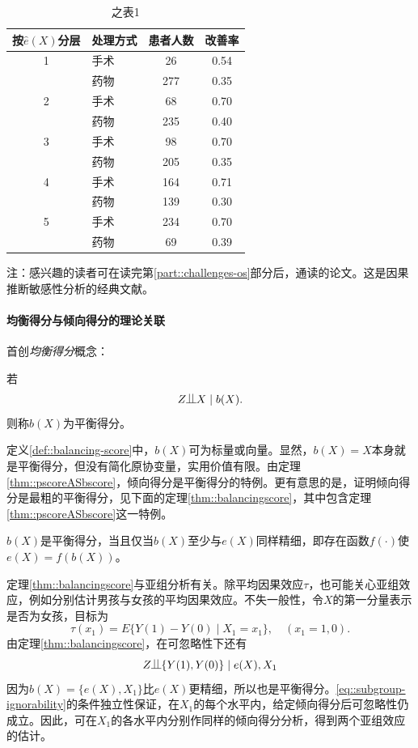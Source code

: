\begin{table}
\caption{\citet{Rosenbaum::1983JRSSB}之表1}\label{table::rr1983table1}
\begin{tabular}{clcc}
\hline 
按$\hat{e}(X)$分层 & 处理方式 &  患者人数 & 改善率\\
\hline 1 & 手术 & 26 & 0.54 \\
& 药物 & 277 & 0.35 \\
2 & 手术 & 68 & 0.70 \\
& 药物 & 235 & 0.40 \\
3 & 手术 & 98 & 0.70 \\
& 药物 & 205 & 0.35 \\
4 & 手术 & 164 & 0.71 \\
& 药物 & 139 & 0.30 \\
5 & 手术 & 234 & 0.70 \\
& 药物 & 69 & 0.39 \\
\hline
\end{tabular}
\end{table}


注：感兴趣的读者可在读完第\ref{part::challenges-os}部分后，通读\citet{Rosenbaum::1983JRSSB}的论文。这是因果推断敏感性分析的经典文献。 

 


\paragraph{均衡得分与倾向得分的理论关联}
\label{hw::balancingscore-rr1983}


\citet{rosenbaum1983central}首创{\it 均衡得分}概念：

\begin{definition}
[均衡得分]\label{def::balancing-score}
  若
$$
  Z\ind X\mid b(X).
  $$
则称$b(X)$为平衡得分。
\end{definition}

定义\ref{def::balancing-score}中，$b(X)$可为标量或向量。显然，$b(X) = X$本身就是平衡得分，但没有简化原协变量，实用价值有限。由定理\ref{thm::pscoreASbscore}，倾向得分是平衡得分的特例。更有意思的是，\citet{rosenbaum1983central}证明倾向得分是最粗的平衡得分，见下面的定理\ref{thm::balancingscore}，其中包含定理\ref{thm::pscoreASbscore}这一特例。 


\begin{theorem}
\label{thm::balancingscore}
$b(X)$是平衡得分，当且仅当$b(X)$至少与$e(X)$同样精细，即存在函数$f(\cdot)$使$e(X) = f(b(X))$。 
\end{theorem}


定理\ref{thm::balancingscore}与亚组分析有关。除平均因果效应$\tau$，也可能关心亚组效应，例如分别估计男孩与女孩的平均因果效应。不失一般性，令$X$的第一分量表示是否为女孩，目标为
$$
\tau(x_1) = E\{ Y(1) - Y(0) \mid X_1 = x_1  \},\quad (x_1=1,0).
$$
由定理\ref{thm::balancingscore}，在可忽略性下还有
\begin{equation}
\label{eq::subgroup-ignorability}
Z\ind \{ Y(1) , Y(0) \} \mid e(X), X_1
\end{equation}
因为$b(X) = \{e(X), X_1\}$比$e(X)$更精细，所以也是平衡得分。\eqref{eq::subgroup-ignorability}的条件独立性保证，在$X_1$的每个水平内，给定倾向得分后可忽略性仍成立。因此，可在$X_1$的各水平内分别作同样的倾向得分分析，得到两个亚组效应的估计。 


